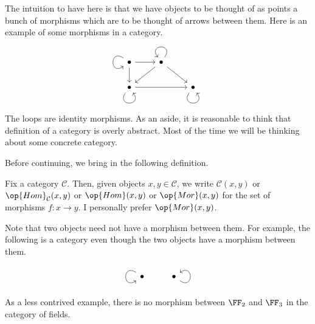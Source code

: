 The intuition to have here is that we have objects to be thought of as points a bunch of morphisms which are to be thought of arrows between them. Here is an example of some morphisms in a category.
\[\begin{tikzcd}
	\bullet \arrow[d] \arrow[r] \arrow[loop, distance=2em, in=215, out=145] & \bullet \arrow[ld] \arrow[rd] \arrow[loop, distance=2em, in=125, out=55] &                                                     \\
	\bullet \arrow[rr] \arrow[loop, distance=2em, in=305, out=235]          &                                                                          & \bullet \arrow[loop, distance=2em, in=305, out=235]
\end{tikzcd}\]
The loops are identity morphisms. As an aside, it is reasonable to think that definition of a category is overly abstract. Most of the time we will be thinking about some concrete category.

Before continuing, we bring in the following definition.
\begin{definition}
	Fix a category $\mathcal C$. Then, given objects $x,y\in\mathcal C$, we write $\mathcal C(x,y)$ or $\op{Hom}_\mathcal C(x,y)$ or $\op{Hom}(x,y)$ or $\op{Mor}(x,y)$ for the set of morphisms $f:x\to y$. I personally prefer $\op{Mor}(x,y)$.
\end{definition}
\noindent Note that two objects need not have a morphism between them. For example, the following is a category even though the two objects have a morphism between them.
\[\begin{tikzcd}
	\bullet \arrow[loop, distance=2em, in=215, out=145] & \bullet \arrow[loop, distance=2em, in=35, out=325]
\end{tikzcd}\]
As a less contrived example, there is no morphism between $\FF_2$ and $\FF_3$ in the category of fields.

